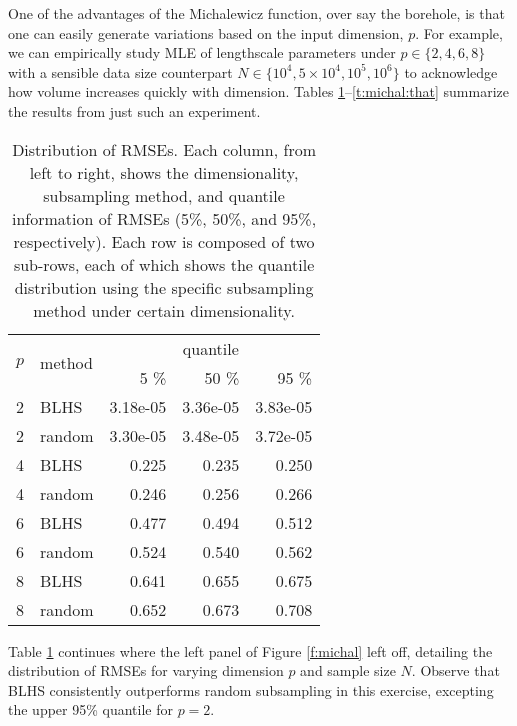 \documentclass[12pt]{article}
\begin{document}
One of the advantages of the Michalewicz function, over say the
borehole, is that one can easily generate variations based on the input
dimension, $p$. For example, we can empirically study MLE of lengthscale
parameters under $p \in \{2, 4, 6, 8\}$ with a sensible data size counterpart 
$N \in \{10^4, 5\times 10^4, 10^5, 10^6\}$ to acknowledge how volume increases
quickly with dimension. Tables
\ref{t:michal:rmse}--\ref{t:michal:that} summarize the results from just such
an experiment.
\begin{table}[ht!]
  \centering
 \begin{tabular}{c l r r r}
  \toprule
  \multirow{2}{*}{$p$} & 
  \multirow{2}{*}{method} & 
  \multicolumn{3}{c}{quantile}\\ \cmidrule(lr){3-5} 
  && { 5 \%} & { 50 \%} & { 95 \%} \\ \cmidrule(lr){1-5} 
  2 & BLHS & 3.18e-05 & 3.36e-05 & 3.83e-05 \\ 
  2 & random & 3.30e-05 & 3.48e-05 & 3.72e-05 \\ 
  \hline
  4 & BLHS & 0.225 & 0.235 & 0.250 \\ 
  4 & random & 0.246 & 0.256 & 0.266 \\ 
  \hline
  6 & BLHS & 0.477 & 0.494 & 0.512 \\ 
  6 & random & 0.524 & 0.540 & 0.562 \\ 
  \hline
  8 & BLHS & 0.641 & 0.655 & 0.675 \\ 
  8 & random & 0.652 & 0.673 & 0.708 \\ 
  \bottomrule
 \end{tabular}
 \caption{Distribution of RMSEs. Each column, from left to right, shows the dimensionality, 
 subsampling method, and quantile information of RMSEs (5\%, 50\%, and 95\%, respectively). Each row 
 is composed of two sub-rows, each of which shows the quantile distribution using the specific subsampling method 
 under certain dimensionality.}
 \label{t:michal:rmse}
\end{table}
Table \ref{t:michal:rmse} continues where the left panel of Figure
\ref{f:michal} left off, detailing the distribution of RMSEs for varying
dimension $p$ and sample size $N$.   Observe that BLHS consistently
outperforms random subsampling in this exercise, excepting the upper 95\% quantile for $p=2$.
\end{document}
